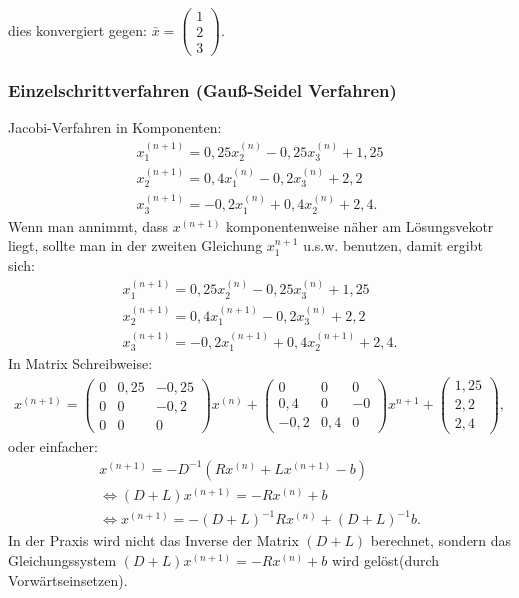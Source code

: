 \documentclass{scrartcl}
\begin{document}
dies konvergiert gegen: $\bar{x}=\begin{pmatrix}
1\\
2\\
3
\end{pmatrix}$.

\subsubsection{Einzelschrittverfahren (Gauß-Seidel Verfahren)}
Jacobi-Verfahren in Komponenten:
\begin{align*}
x_1^{(n+1)}=0,25 x^{(n)}_2-0,25 x^{(n)}_3 +1,25\\
x_2^{(n+1)}=0,4 x^{(n)}_1-0,2 x^{(n)}_3 +2,2\\
x_3^{(n+1)}=-0,2 x^{(n)}_1+0,4 x^{(n)}_2 +2,4.
\end{align*}
Wenn man annimmt, dass $x^{(n+1)}$ komponentenweise näher am Lösungsvekotr liegt, sollte man in der zweiten Gleichung $x_1^{n+1}$ u.s.w. benutzen, damit ergibt sich:
\begin{align*}
x_1^{(n+1)}=0,25 x^{(n)}_2-0,25 x^{(n)}_3 +1,25\\
x_2^{(n+1)}=0,4 x^{(n+1)}_1-0,2 x^{(n)}_3 +2,2\\
x_3^{(n+1)}=-0,2 x^{(n+1)}_1+0,4 x^{(n+1)}_2 +2,4.
\end{align*}
In Matrix Schreibweise:
\begin{align*}
x^{(n+1)}=\begin{pmatrix}
0 & 0,25 & -0,25\\
0& 0 & -0,2\\
0& 0 & 0
\end{pmatrix} x^{(n)}+
\begin{pmatrix}
0 & 0 & 0\\
0,4& 0 & -0\\
-0,2& 0,4 & 0
\end{pmatrix} x^{n+1}+
\begin{pmatrix}
1,25\\
2,2\\
2,4
\end{pmatrix},
\end{align*}
oder einfacher:
\begin{align*}
x^{(n+1)}=-D^{-1}(R x^{(n)}+L x^{(n+1)}-b)\\
\Leftrightarrow (D+L)x^{(n+1)}=-R x^{(n)}+b\\
\Leftrightarrow x^{(n+1)}=-(D+L)^{-1} R x^{(n)}+(D+L)^{-1} b.
\end{align*}
In der Praxis wird nicht das Inverse der Matrix $(D+L)$ berechnet, sondern das Gleichungssystem $(D+L)x^{(n+1)}=-R x^{(n)}+b$ wird gelöst(durch Vorwärtseinsetzen).\\
\end{document}

